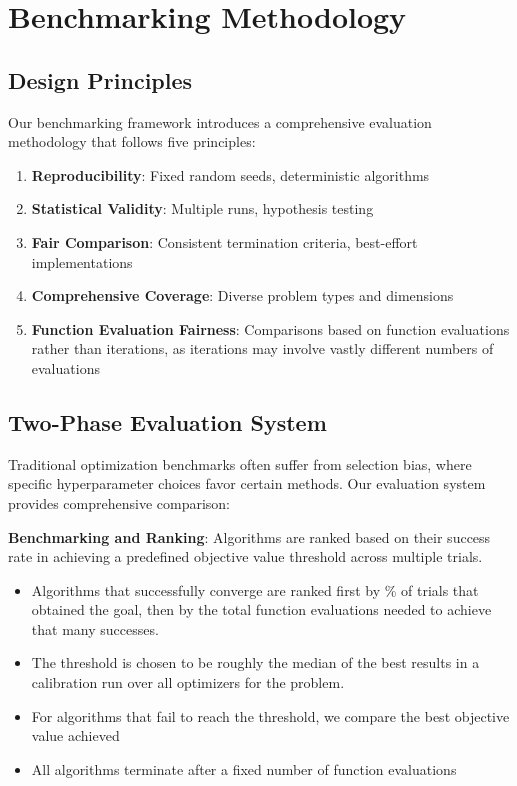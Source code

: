 \hypertarget{benchmarking-methodology}{%
\section{Benchmarking Methodology}\label{benchmarking-methodology}}

\hypertarget{design-principles}{%
\subsection{Design Principles}\label{design-principles}}

Our benchmarking framework introduces a comprehensive evaluation methodology that follows five principles:

\begin{enumerate}
\def\labelenumi{\arabic{enumi}.}
\tightlist
\item
  \textbf{Reproducibility}: Fixed random seeds, deterministic algorithms
\item
  \textbf{Statistical Validity}: Multiple runs, hypothesis testing
\item
  \textbf{Fair Comparison}: Consistent termination criteria, best-effort implementations
\item
  \textbf{Comprehensive Coverage}: Diverse problem types and dimensions
\item
  \textbf{Function Evaluation Fairness}: Comparisons based on function evaluations rather than iterations, as iterations may involve vastly different numbers of evaluations
\end{enumerate}

\hypertarget{two-phase-evaluation-system}{%
\subsection{Two-Phase Evaluation System}\label{two-phase-evaluation-system}}

Traditional optimization benchmarks often suffer from selection bias, where specific hyperparameter choices favor certain methods. Our evaluation system provides comprehensive comparison:

\textbf{Benchmarking and Ranking}: Algorithms are ranked based on their success rate in achieving a predefined objective value threshold across multiple trials.

\begin{itemize}
\tightlist
\item
  Algorithms that successfully converge are ranked first by \% of trials that obtained the goal, then by the total function evaluations needed to achieve that many successes.
\item
  The threshold is chosen to be roughly the median of the best results in a calibration run over all optimizers for the problem.
\item
  For algorithms that fail to reach the threshold, we compare the best objective value achieved
\item
  All algorithms terminate after a fixed number of function evaluations
\end{itemize}

